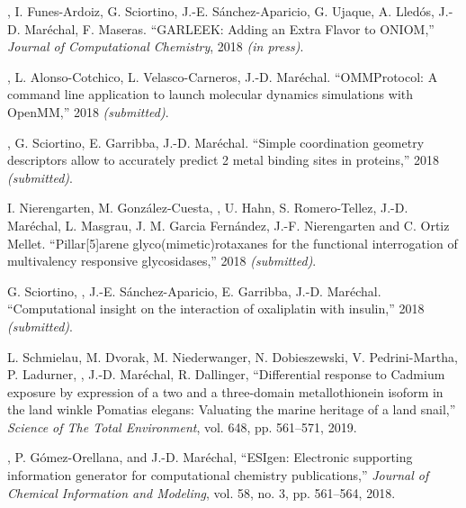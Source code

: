 \begin{etaremune}

\item {}, I. Funes-Ardoiz, G. Sciortino, J.-E. Sánchez-Aparicio, G. Ujaque, A. Lledós, J.-D. Maréchal, F. Maseras. ``GARLEEK: Adding an Extra Flavor to ONIOM,'' {\em Journal of Computational Chemistry}, 2018 {\em (in press)}.

\item {}, L. Alonso-Cotchico, L. Velasco-Carneros, J.-D. Maréchal. ``OMMProtocol: A command line application to launch molecular dynamics simulations with OpenMM,'' 2018 {\em (submitted)}.

\item {}, G. Sciortino, E. Garribba, J.-D. Maréchal. ``Simple coordination geometry descriptors allow to accurately predict
2 metal binding sites in proteins,'' 2018 {\em (submitted)}.

\item I. Nierengarten, M. González-Cuesta, , U. Hahn, S. Romero-Tellez, J.-D. Maréchal, L. Masgrau, J. M. Garcia Fernández, J.-F.
Nierengarten and C. Ortiz Mellet. ``Pillar[5]arene glyco(mimetic)rotaxanes for the functional interrogation of multivalency responsive glycosidases,'' 2018 {\em (submitted)}.

\item G. Sciortino, , J.-E. Sánchez-Aparicio, E. Garribba, J.-D. Maréchal. ``Computational insight on the interaction of oxaliplatin with insulin,'' 2018 {\em (submitted)}.

\item L. Schmielau, M. Dvorak, M. Niederwanger, N. Dobieszewski, V. Pedrini-Martha, P. Ladurner, , J.-D. Mar{\'e}chal, R. Dallinger, ``Differential response to Cadmium exposure by expression of a two and a three-domain metallothionein isoform in the land winkle Pomatias elegans: Valuating the marine heritage of a land snail,'' {\em Science of The Total Environment}, vol. 648, pp. 561--571, 2019.

\item {}, P. G{\'o}mez-Orellana, and J.-D. Mar{\'e}chal, ``{ESIgen}: Electronic supporting information generator for computational chemistry publications,'' {\em Journal of Chemical Information and Modeling}, vol. 58, no. 3, pp. 561--564, 2018.


\end{etaremune}
